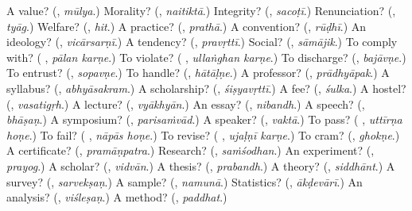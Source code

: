 \begin{tcolorbox}[breakable,colback=teal!4,colframe=teal!35!black,title={Before you move on}]
A value? (\textbf{}, \emph{mūlya}.) Morality? (\textbf{}, \emph{naitiktā}.) Integrity? (\textbf{}, \emph{sacoṭī}.) Renunciation? (\textbf{}, \emph{tyāg}.) Welfare? (\textbf{}, \emph{hit}.) A practice? (\textbf{}, \emph{prathā}.) A convention? (\textbf{}, \emph{rūḍhī}.) An ideology? (\textbf{}, \emph{vicārsarṇī}.) A tendency? (\textbf{}, \emph{pravṛttī}.) Social? (\textbf{}, \emph{sāmājik}.) To comply with? (\textbf{ }, \emph{pālan karṇe}.) To violate? (\textbf{ }, \emph{ullaṅghan karṇe}.) To discharge? (\textbf{}, \emph{bajāvṇe}.) To entrust? (\textbf{}, \emph{sopavṇe}.) To handle? (\textbf{}, \emph{hātāḷṇe}.) A professor? (\textbf{}, \emph{prādhyāpak}.) A syllabus? (\textbf{}, \emph{abhyāsakram}.) A scholarship? (\textbf{}, \emph{śiṣyavṛttī}.) A fee? (\textbf{}, \emph{śulka}.) A hostel? (\textbf{}, \emph{vasatigṛh}.) A lecture? (\textbf{}, \emph{vyākhyān}.) An essay? (\textbf{}, \emph{nibandh}.) A speech? (\textbf{}, \emph{bhāṣaṇ}.) A symposium? (\textbf{}, \emph{parisaṁvād}.) A speaker? (\textbf{}, \emph{vaktā}.) To pass? (\textbf{ }, \emph{uttīrṇa hoṇe}.) To fail? (\textbf{ }, \emph{nāpās hoṇe}.) To revise? (\textbf{ }, \emph{ujaḷṇī karṇe}.) To cram? (\textbf{}, \emph{ghokṇe}.) A certificate? (\textbf{}, \emph{pramāṇpatra}.) Research? (\textbf{}, \emph{saṁśodhan}.) An experiment? (\textbf{}, \emph{prayog}.) A scholar? (\textbf{}, \emph{vidvān}.) A thesis? (\textbf{}, \emph{prabandh}.) A theory? (\textbf{}, \emph{siddhānt}.) A survey? (\textbf{}, \emph{sarvekṣaṇ}.) A sample? (\textbf{}, \emph{namunā}.) Statistics? (\textbf{}, \emph{ākḍevārī}.) An analysis? (\textbf{}, \emph{viśleṣaṇ}.) A method? (\textbf{}, \emph{paddhat}.)
\end{tcolorbox}
